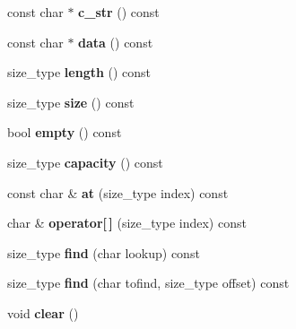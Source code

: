 \begin{DoxyCompactItemize}
\item 
\mbox{\label{class_ti_xml_string_ae2bd36349215612ebcc3cb221c30bd3d}} 
const char $\ast$ {\bfseries c\+\_\+str} () const
\item 
\mbox{\label{class_ti_xml_string_a0e010e1737cfc3ee885b42875171b88e}} 
const char $\ast$ {\bfseries data} () const
\item 
\mbox{\label{class_ti_xml_string_a5db17f8314ffe2a89df0f0eb6c2a4bf5}} 
size\+\_\+type {\bfseries length} () const
\item 
\mbox{\label{class_ti_xml_string_a483d85103d2a3ba8c0831e205c832f33}} 
size\+\_\+type {\bfseries size} () const
\item 
\mbox{\label{class_ti_xml_string_a3139aafb0f0a8e26d1a4ed58a50f3678}} 
bool {\bfseries empty} () const
\item 
\mbox{\label{class_ti_xml_string_a0ca248f026e698f79b8aa4c9ab8e1571}} 
size\+\_\+type {\bfseries capacity} () const
\item 
\mbox{\label{class_ti_xml_string_a7f33c37f7dfde5193f02521d2a7af1db}} 
const char \& {\bfseries at} (size\+\_\+type index) const
\item 
\mbox{\label{class_ti_xml_string_a06e8c84831fc146610369405f4aa4200}} 
char \& {\bfseries operator\mbox{[}$\,$\mbox{]}} (size\+\_\+type index) const
\item 
\mbox{\label{class_ti_xml_string_a22fc54a23c5a0ab771331a25a769516e}} 
size\+\_\+type {\bfseries find} (char lookup) const
\item 
\mbox{\label{class_ti_xml_string_a2d66cfd6986faceda62ca62db553a921}} 
size\+\_\+type {\bfseries find} (char tofind, size\+\_\+type offset) const
\item 
\mbox{\label{class_ti_xml_string_ab20e06e4c666abf3bdbfb3a1191d4888}} 
void {\bfseries clear} ()
\item 

\end{DoxyCompactItemize}
